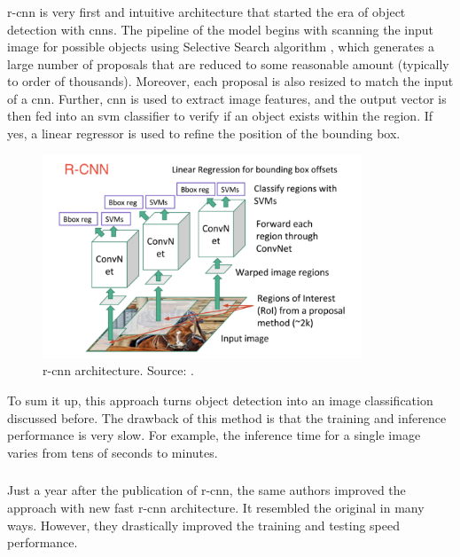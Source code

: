         \subsubsection{}
            \Gls{r-cnn} \cite{girshick2016region} is very first and intuitive architecture that started the era of object detection with \gls{cnn}s. The pipeline of the model begins with scanning the input image for possible objects using Selective Search algorithm \cite{uijlings2013selective}, which generates a large number of proposals that are reduced to some reasonable amount (typically to order of thousands). Moreover, each proposal is also resized to match the input of a \gls{cnn}. Further, \gls{cnn} is used to extract image features, and the output vector is then fed into an \gls{svm} \cite{cortes1995support} classifier to verify if an object exists within the region. If yes, a linear regressor is used to refine the position of the bounding box.
            
            \begin{figure}[ht]
                \centering
                \includegraphics[width=0.85\textwidth]{resources/r_cnn_architecture.png}
                \caption{\Gls{r-cnn} architecture. Source: \cite{xuobjectdetection}.}
                \label{fig:r-cnn architecture}
            \end{figure}
        
            To sum it up, this approach turns object detection into an image classification discussed before. The drawback of this method is that the training and inference performance is very slow. For example, the inference time for a single image varies from tens of seconds to minutes.

        \subsubsection{}
            Just a year after the publication of \gls{r-cnn}, the same authors improved the approach with new \gls{fast r-cnn} \cite{girshick2015fast} architecture. It resembled the original in many ways. However, they drastically improved the training and testing speed performance.
            
